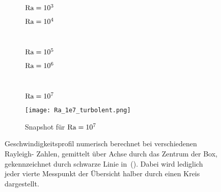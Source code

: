 \begin{figure}[!h]
        \centering
        \begin{subfigure}{0.5\textwidth}
        
        \caption{$\textnormal{Ra} = \num{e3}$}
        \label{fig:vprof_Ra_1e3}
\end{subfigure}\hfill
        \begin{subfigure}{0.5\textwidth}
        
        \caption{$\textnormal{Ra} = \num{e4}$}
        \label{fig:vprof_Ra_1e4}
\end{subfigure} \\
        \begin{subfigure}{0.5\textwidth}
        
        \caption{$\textnormal{Ra} = \num{e5}$}
        \label{fig:vprof_Ra_1e5}
\end{subfigure}\hfill
        \begin{subfigure}{0.5\textwidth}
        
        \caption{$\textnormal{Ra} = \num{e6}$}
        \label{fig:vprof_Ra_1e6}
\end{subfigure} \\
        \begin{subfigure}{0.5\textwidth}
        
        \caption{$\textnormal{Ra} = \num{e7}$}
        \label{fig:vprof_Ra_1e7}
\end{subfigure}\hfill
        \begin{subfigure}{0.5\textwidth}
                \texttt{[image: Ra\_1e7\_turbolent.png]}
                \caption{Snapshot für $\textnormal{Ra} = \num{e7}$}
                \label{fig:SimSnapshot}
         \end{subfigure}
        \caption{Geschwindigkeitsprofil numerisch berechnet bei verschiedenen Rayleigh-
        Zahlen, gemittelt über Achse durch das Zentrum der Box, gekennzeichnet durch
        schwarze Linie in~(). Dabei wird lediglich jeder vierte 
        Messpunkt der Übersicht halber durch einen Kreis dargestellt.}
        \label{fig:SimVprof}
\end{figure}

